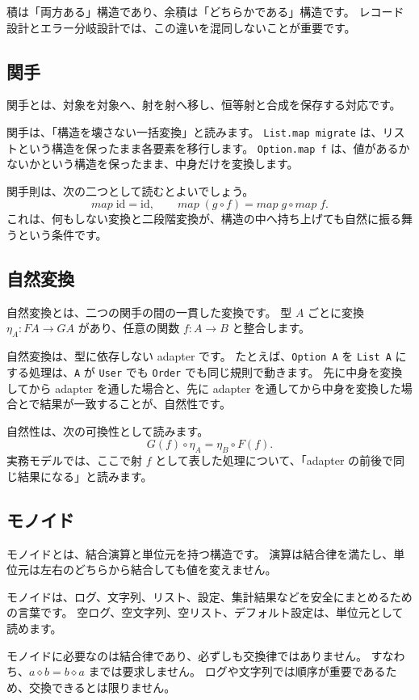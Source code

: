 積は「両方ある」構造であり、余積は「どちらかである」構造です。
レコード設計とエラー分岐設計では、この違いを混同しないことが重要です。

\subsection{関手}

関手とは、対象を対象へ、射を射へ移し、恒等射と合成を保存する対応です。

関手は、「構造を壊さない一括変換」と読みます。
\texttt{List.map migrate} は、リストという構造を保ったまま各要素を移行します。
\texttt{Option.map f} は、値があるかないかという構造を保ったまま、中身だけを変換します。

関手則は、次の二つとして読むとよいでしょう。
\[
map\;\mathrm{id} = \mathrm{id}, \qquad map\;(g \circ f) = map\;g \circ map\;f.
\]
これは、何もしない変換と二段階変換が、構造の中へ持ち上げても自然に振る舞うという条件です。

\subsection{自然変換}

自然変換とは、二つの関手の間の一貫した変換です。
型 \(A\) ごとに変換 \(\eta_A : F A \to G A\) があり、任意の関数 \(f : A \to B\) と整合します。

自然変換は、型に依存しない adapter です。
たとえば、\texttt{Option A} を \texttt{List A} にする処理は、\texttt{A} が \texttt{User} でも \texttt{Order} でも同じ規則で動きます。
先に中身を変換してから adapter を通した場合と、先に adapter を通してから中身を変換した場合とで結果が一致することが、自然性です。

自然性は、次の可換性として読みます。
\[
G(f) \circ \eta_A = \eta_B \circ F(f).
\]
実務モデルでは、ここで射 \(f\) として表した処理について、「adapter の前後で同じ結果になる」と読みます。

\subsection{モノイド}

モノイドとは、結合演算と単位元を持つ構造です。
演算は結合律を満たし、単位元は左右のどちらから結合しても値を変えません。

モノイドは、ログ、文字列、リスト、設定、集計結果などを安全にまとめるための言葉です。
空ログ、空文字列、空リスト、デフォルト設定は、単位元として読めます。

モノイドに必要なのは結合律であり、必ずしも交換律ではありません。
すなわち、\(a \diamond b = b \diamond a\) までは要求しません。
ログや文字列では順序が重要であるため、交換できるとは限りません。

